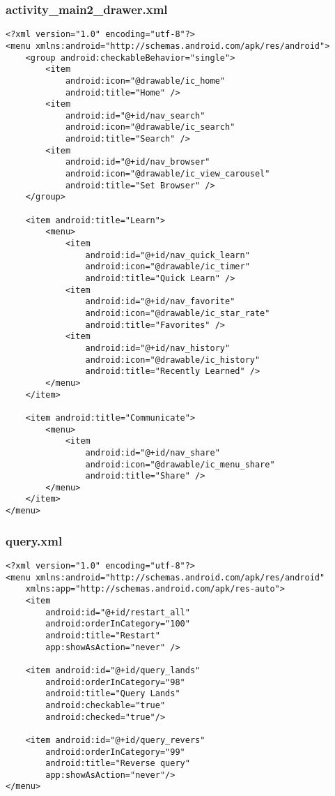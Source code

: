 \subsubsection*{activity\_main2\_drawer.xml}
\begin{lstlisting}
<?xml version="1.0" encoding="utf-8"?>
<menu xmlns:android="http://schemas.android.com/apk/res/android">
    <group android:checkableBehavior="single">
        <item
            android:icon="@drawable/ic_home"
            android:title="Home" />
        <item
            android:id="@+id/nav_search"
            android:icon="@drawable/ic_search"
            android:title="Search" />
        <item
            android:id="@+id/nav_browser"
            android:icon="@drawable/ic_view_carousel"
            android:title="Set Browser" />
    </group>

    <item android:title="Learn">
        <menu>
            <item
                android:id="@+id/nav_quick_learn"
                android:icon="@drawable/ic_timer"
                android:title="Quick Learn" />
            <item
                android:id="@+id/nav_favorite"
                android:icon="@drawable/ic_star_rate"
                android:title="Favorites" />
            <item
                android:id="@+id/nav_history"
                android:icon="@drawable/ic_history"
                android:title="Recently Learned" />
        </menu>
    </item>

    <item android:title="Communicate">
        <menu>
            <item
                android:id="@+id/nav_share"
                android:icon="@drawable/ic_menu_share"
                android:title="Share" />
        </menu>
    </item>
</menu>
\end{lstlisting}

\subsubsection*{query.xml}
\begin{lstlisting}
<?xml version="1.0" encoding="utf-8"?>
<menu xmlns:android="http://schemas.android.com/apk/res/android"
    xmlns:app="http://schemas.android.com/apk/res-auto">
    <item
        android:id="@+id/restart_all"
        android:orderInCategory="100"
        android:title="Restart"
        app:showAsAction="never" />

    <item android:id="@+id/query_lands"
        android:orderInCategory="98"
        android:title="Query Lands"
        android:checkable="true"
        android:checked="true"/>

    <item android:id="@+id/query_revers"
        android:orderInCategory="99"
        android:title="Reverse query"
        app:showAsAction="never"/>
</menu>
\end{lstlisting}

